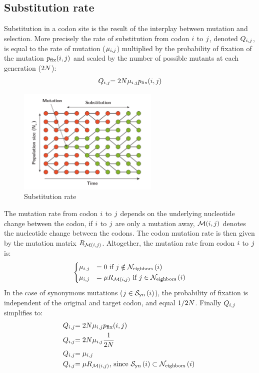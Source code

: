 \subsection{Substitution rate}
Substitution in a codon site is the result of the interplay between mutation and selection.
More precisely the rate of substitution from codon ${i}$ to ${j}$, denoted $Q_{{i}, {j}}$, is equal to the rate of mutation ($\mu_{{i}, {j}}$) multiplied by the probability of fixation of the mutation $p_{\mathrm{fix}}({i}, {j})$ and scaled by the number of possible mutants at each generation ($2N$):
\begin{align}
{Q_{{i}, {j}}} & { = 2 N \mu_{{i}, {j}}  p_{\mathrm{fix}}}({i}, {j}) \\
\end{align}
\begin{figure}[thbp]
	\centering
	\includegraphics[width=0.6\textwidth]{figures/proba-fixation.pdf}
	\caption{Substitution rate}
\end{figure}
The mutation rate from codon ${i}$ to ${j}$ depends on the underlying nucleotide change between the codon, if ${i}$ to ${j}$ are only a mutation away, $\mathcal{M}({i}, {j})$ denotes the nucleotide change between the codons. The codon mutation rate is then given by the mutation matrix ${R_{\mathcal{M}({i}, {j})}}$. Altogether, the mutation rate from codon ${i}$ to ${j}$ is:
\begin{equation}
\begin{dcases}
\mu_{{i}, {j}} & = 0 \text{ if } {j} \notin \mathcal{N}_{\mathrm{eighbors}}\left({i}\right) \\
\mu_{{i}, {j}} & = \mu R_{\mathcal{M}({i}, {j})} \text{ if } {j} \in \mathcal{N}_{\mathrm{eighbors}}\left({i}\right)
\end{dcases}
\end{equation}
In the case of synonymous mutations (${j} \in \mathcal{S}_{\mathrm{yn}}\left({i}\right) $), the probability of fixation is independent of the original and target codon, and equal $1/2 N$. Finally ${Q_{{i}, {j}}}$ simplifies to: 
\begin{align}
{Q_{{i}, {j}}} & { = 2 N \mu_{{i}, {j}}  p_{\mathrm{fix}}}({i}, {j}) \nonumber \\
{Q_{{i}, {j}}} & { = 2 N \mu_{{i}, {j}} \dfrac{1}{2N}} \nonumber \\
{Q_{{i}, {j}}} & { =  \mu_{{i}, {j}} } \nonumber \\
{Q_{{i}, {j}}} & { =  \mu R_{\mathcal{M}({i}, {j})} }\text{, since } \mathcal{S}_{\mathrm{yn}}\left({i}\right) \subset \mathcal{N}_{\mathrm{eighbors}}\left({i}\right) \
\end{align}
